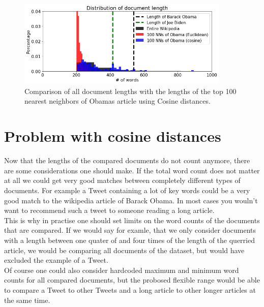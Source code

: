 \documentclass[12pt]{scrreprt}
\begin{document}
\begin{figure}[H]
  \begin{center}
    \caption{Comparison of all document lengths with the lengths of the top 100 nearest neighbors of Obamas article using Cosine distances.}
    \label{fig:length_2}
    \includegraphics[width=0.9\textwidth, angle=0]{output_78_1.png}
  \end{center}
\end{figure}

\section{Problem with cosine distances}

Now that the lengths of the compared documents do not count anymore, there are some considerations one should make. If the total word count does not matter at all we could get very good matches between completely different types of documents. For example a Tweet containing a lot of key words could be a very good match to the wikipedia article of Barack Obama. In most cases you wouln't want to recommend such a tweet to someone reading a long article.\\

This is why in practise one should set limits on the word counts of the documents that are compared. If we would say for examle, that we only consider documents with a length between one quater of and four times of the length of the querried article, we would be comparing all documents of the dataset, but would have excluded the example of a Tweet.\\

Of course one could also consider hardcoded maximum and minimum word counts for all compared documents, but the probosed flexible range would be able to compare a Tweet to other Tweets and a long article to other longer articles at the same time.\\
\end{document}
